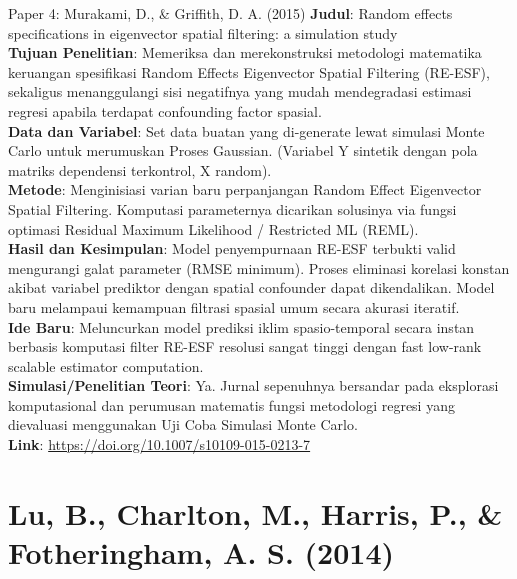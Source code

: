 \documentclass{beamer}
\begin{document}
\begin{frame}[allowframebreaks]{Paper 4: Murakami, D., \& Griffith, D. A. (2015)}
    \textbf{Judul}: Random effects specifications in eigenvector spatial filtering: a simulation study \\
    \textbf{Tujuan Penelitian}: Memeriksa dan merekonstruksi metodologi matematika keruangan spesifikasi Random Effects Eigenvector Spatial Filtering (RE-ESF), sekaligus menanggulangi sisi negatifnya yang mudah mendegradasi estimasi regresi apabila terdapat confounding factor spasial. \\
    \vspace{0.3cm}
    \textbf{Data dan Variabel}: Set data buatan yang di-generate lewat simulasi Monte Carlo untuk merumuskan Proses Gaussian. (Variabel Y sintetik dengan pola matriks dependensi terkontrol, X random). \\
    \vspace{0.3cm}
    \textbf{Metode}: Menginisiasi varian baru perpanjangan Random Effect Eigenvector Spatial Filtering. Komputasi parameternya dicarikan solusinya via fungsi optimasi Residual Maximum Likelihood / Restricted ML (REML). \\
    \framebreak
    \textbf{Hasil dan Kesimpulan}: Model penyempurnaan RE-ESF terbukti valid mengurangi galat parameter (RMSE minimum). Proses eliminasi korelasi konstan akibat variabel prediktor dengan spatial confounder dapat dikendalikan. Model baru melampaui kemampuan filtrasi spasial umum secara akurasi iteratif. \\
    \vspace{0.3cm}
    \textbf{Ide Baru}: Meluncurkan model prediksi iklim spasio-temporal secara instan berbasis komputasi filter RE-ESF resolusi sangat tinggi dengan fast low-rank scalable estimator computation. \\
    \vspace{0.3cm}
    \textbf{Simulasi/Penelitian Teori}: Ya. Jurnal sepenuhnya bersandar pada eksplorasi komputasional dan perumusan matematis fungsi metodologi regresi yang dievaluasi menggunakan Uji Coba Simulasi Monte Carlo. \\
    \vspace{0.3cm}
    \textbf{Link}: \url{https://doi.org/10.1007/s10109-015-0213-7}
\end{frame}

\section{Lu, B., Charlton, M., Harris, P., \& Fotheringham, A. S. (2014)}
\end{document}
